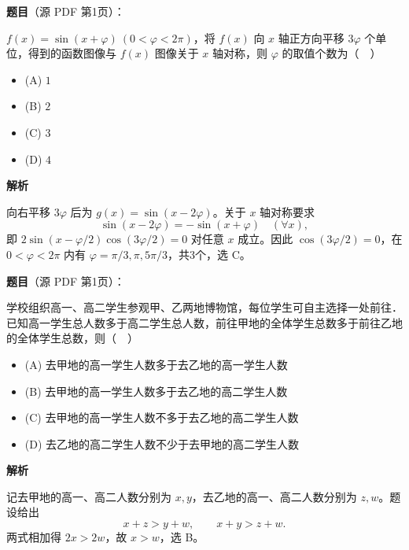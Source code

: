 \begin{answer}

\textbf{题目}（源 PDF 第1页）：

\(f(x)=\sin(x+\varphi)\ (0<\varphi<2\pi)\)，将 \(f(x)\) 向 \(x\) 轴正方向平移 \(3\varphi\) 个单位，得到的函数图像与 \(f(x)\) 图像关于 \(x\) 轴对称，则 \(\varphi\) 的取值个数为（　）

\begin{itemize}
\item (A) \(1\)
\item (B) \(2\)
\item (C) \(3\)
\item (D) \(4\)
\end{itemize}

\textbf{解析}

向右平移 \(3\varphi\) 后为 \(g(x)=\sin(x-2\varphi)\)。关于 \(x\) 轴对称要求
\nopagebreak[4]
\[
\sin(x-2\varphi)=-\sin(x+\varphi)\quad(\forall x),
\]
即 \(2\sin(x-\varphi/2)\cos(3\varphi/2)=0\) 对任意 \(x\) 成立。因此 \(\cos(3\varphi/2)=0\)，在 \(0<\varphi<2\pi\) 内有 \(\varphi=\pi/3,\pi,5\pi/3\)，共3个，选 C。


\end{answer}
\begin{answer}

\textbf{题目}（源 PDF 第1页）：

学校组织高一、高二学生参观甲、乙两地博物馆，每位学生可自主选择一处前往．已知高一学生总人数多于高二学生总人数，前往甲地的全体学生总数多于前往乙地的全体学生总数，则（　）

\begin{itemize}
\item (A) 去甲地的高一学生人数多于去乙地的高一学生人数
\item (B) 去甲地的高一学生人数多于去乙地的高二学生人数
\item (C) 去甲地的高一学生人数不多于去乙地的高二学生人数
\item (D) 去乙地的高二学生人数不少于去甲地的高二学生人数
\end{itemize}

\textbf{解析}

记去甲地的高一、高二人数分别为 \(x,y\)，去乙地的高一、高二人数分别为 \(z,w\)。题设给出
\nopagebreak[4]
\[
x+z>y+w,\qquad x+y>z+w.
\]
两式相加得 \(2x>2w\)，故 \(x>w\)，选 B。


\end{answer}
